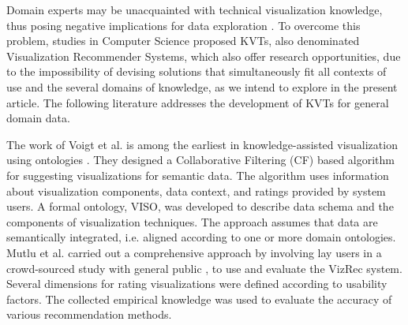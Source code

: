 \documentclass[]{interact}
\theoremstyle{plain}%
\theoremstyle{definition}
\theoremstyle{remark}
\theoremstyle{definition}
\begin{document}
Domain experts may be unacquainted with technical visualization knowledge, thus posing negative implications for data exploration \citep{Mutlu2016}. To overcome this problem, studies in Computer Science proposed KVTs, also denominated Visualization Recommender Systems, which also offer research opportunities, due to the impossibility of devising solutions that simultaneously fit all contexts of use and the several domains of knowledge, as we intend to explore in the present article. The following literature addresses the development of KVTs for general domain data.



The work of Voigt et al. is among the earliest in knowledge-assisted visualization using ontologies \citep{Voigt2013}. They designed a Collaborative Filtering (CF) based algorithm for suggesting visualizations for semantic data. The algorithm uses information about visualization components, data context, and ratings provided by system users. A formal ontology, VISO, was developed to describe data schema and the components of visualization techniques. The approach assumes that data are semantically integrated, i.e. aligned according to one or more domain ontologies. Mutlu et al. carried out a comprehensive approach by involving lay users in a crowd-sourced study with general public \citep{Mutlu2016}, to use and evaluate the VizRec system. Several dimensions for rating visualizations were defined according to usability factors. The collected empirical knowledge was used to evaluate the accuracy of various recommendation methods.
\end{document}

